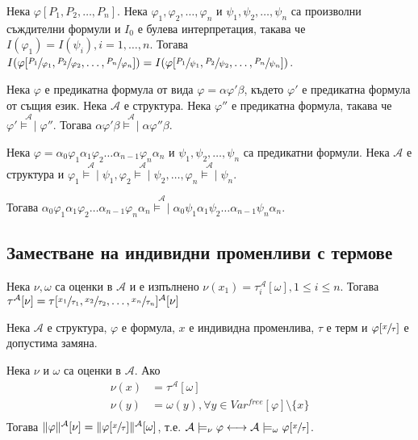 \documentclass{article}
\newcommand{\mymod}{\models\!\mid}
\begin{document}
\begin{claim}
Нека $\varphi[P_1, P_2, \ldots, P_n]$. Нека $\varphi_1, \varphi_2, \ldots, \varphi_n$ и $\psi_1, \psi_2, \ldots, \psi_n$ са произволни съждителни формули и $I_0$ е булева интерпретация, такава че $I(\varphi_1) = I(\psi_i), i = 1,\ldots, n$. Тогава $I(\varphi[\sfrac{P_1}{\varphi_1}, \sfrac{P_2}{\varphi_2}, \ldots, \sfrac{P_n}{\varphi_n}]) = I(\varphi[\sfrac{P_1}{\psi_1}, \sfrac{P_2}{\psi_2}, \ldots, \sfrac{P_n}{\psi_n}])$.
\end{claim}


\begin{claim}
Нека $\varphi$ е предикатна формула от вида $\varphi = \alpha\varphi'\beta$, където $\varphi'$ е предикатна формула от същия език. Нека $\mathcal{A}$ е структура. Нека $\varphi''$ е предикатна формула, такава че $\varphi' \overset{\mathcal{A}}{\mymod} \varphi''$. Тогава $\alpha\varphi'\beta \overset{\mathcal{A}}{\mymod} \alpha\varphi''\beta$.
\end{claim}

\begin{claim}
Нека $\varphi = \alpha_0\varphi_1\alpha_1\varphi_2\ldots\alpha_{n-1}\varphi_n\alpha_n$ и $\psi_1, \psi_2, \ldots, \psi_n$ са предикатни формули. Нека $\mathcal{A}$ е структура и $\varphi_1 \overset{\mathcal{A}}{\mymod} \psi_1, \varphi_2 \overset{\mathcal{A}}{\mymod} \psi_2, \ldots, \varphi_n \overset{\mathcal{A}}{\mymod} \psi_n$.

Тогава $\alpha_0\varphi_1\alpha_1\varphi_2\ldots\alpha_{n-1}\varphi_n\alpha_n \overset{\mathcal{A}}{\mymod} \alpha_0\psi_1\alpha_1\psi_2\ldots\alpha_{n-1}\psi_n\alpha_n$.
\end{claim}


\subsection*{Заместване на индивидни променливи с термове}

\begin{claim}
Нека $\nu, \omega$ са оценки в $\mathcal{A}$ и е изпълнено $\nu(x_1) = \tau^\mathcal{A}_i[\omega], 1 \leq i \leq n$. Тогава $\tau^\mathcal{A}[\nu] = \tau[\sfrac{x_1}{\tau_1}, \sfrac{x_2}{\tau_2}, \ldots, \sfrac{x_n}{\tau_n}]^\mathcal{A}[\nu]$
\end{claim}

\begin{claim}
Нека $\mathcal{A}$ е структура, $\varphi$ е формула, $x$ е индивидна променлива, $\tau$ е терм и $\varphi[\sfrac{x}{\tau}]$ е допустима замяна.

Нека $\nu$ и $\omega$ са оценки в $\mathcal{A}$. Ако
\begin{align*}
  \nu(x) &= \tau^\mathcal{A}[\omega]\\ 
  \nu(y) &= \omega(y), \forall y \in Var^{free}[\varphi]\setminus\{x\}\\ 
\end{align*}
Тогава $\|\varphi\|^\mathcal{A}[\nu] = \|\varphi[\sfrac{x}{\tau}]\|^\mathcal{A}[\omega]$, т.е. $\mathcal{A} \models_\nu \varphi \longleftrightarrow \mathcal{A} \models_\omega \varphi[\sfrac{x}{\tau}]$.
\end{claim}
\end{document}
